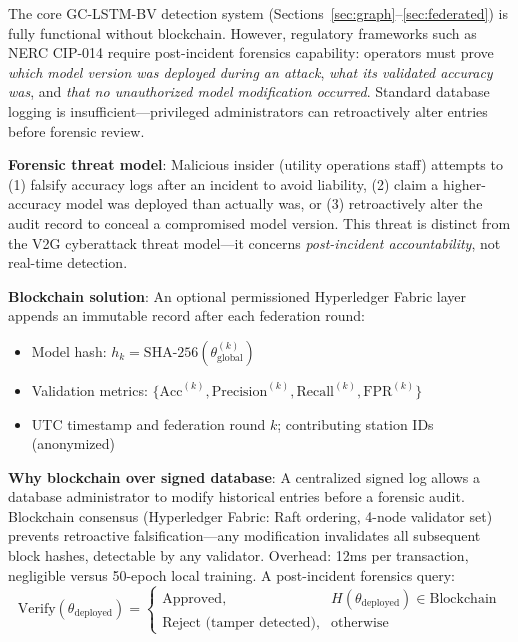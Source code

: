 \documentclass[journal]{IEEEtran}
\begin{document}
The core GC-LSTM-BV detection system (Sections~\ref{sec:graph}--\ref{sec:federated}) is fully functional without blockchain. However, regulatory frameworks such as NERC CIP-014 require post-incident forensics capability: operators must prove \textit{which model version was deployed during an attack}, \textit{what its validated accuracy was}, and \textit{that no unauthorized model modification occurred}. Standard database logging is insufficient—privileged administrators can retroactively alter entries before forensic review.

\textbf{Forensic threat model}: Malicious insider (utility operations staff) attempts to (1) falsify accuracy logs after an incident to avoid liability, (2) claim a higher-accuracy model was deployed than actually was, or (3) retroactively alter the audit record to conceal a compromised model version. This threat is distinct from the V2G cyberattack threat model—it concerns \textit{post-incident accountability}, not real-time detection.

\textbf{Blockchain solution}: An optional permissioned Hyperledger Fabric layer appends an immutable record after each federation round:
\begin{itemize}
    \item Model hash: $h_k = \text{SHA-256}(\theta_{\text{global}}^{(k)})$
    \item Validation metrics: $\{\text{Acc}^{(k)}, \text{Precision}^{(k)}, \text{Recall}^{(k)}, \text{FPR}^{(k)}\}$
    \item UTC timestamp and federation round $k$; contributing station IDs (anonymized)
\end{itemize}

\textbf{Why blockchain over signed database}: A centralized signed log allows a database administrator to modify historical entries before a forensic audit. Blockchain consensus (Hyperledger Fabric: Raft ordering, 4-node validator set) prevents retroactive falsification—any modification invalidates all subsequent block hashes, detectable by any validator. Overhead: 12ms per transaction, negligible versus 50-epoch local training. A post-incident forensics query:
\begin{equation}
\text{Verify}(\theta_{\text{deployed}}) = \begin{cases}
\text{Approved}, & H(\theta_{\text{deployed}}) \in \text{Blockchain} \\
\text{Reject (tamper detected)}, & \text{otherwise}
\end{cases}
\end{equation}
\end{document}
